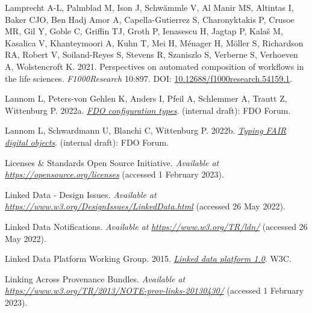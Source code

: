 \begin{CSLReferences}{1}{0}
\leavevmode{}%
Lamprecht A-L, Palmblad M, Ison J, Schwämmle V, Al Manir MS, Altintas I, Baker CJO, Ben Hadj Amor A, Capella-Gutierrez S, Charonyktakis P, Crusoe MR, Gil Y, Goble C, Griffin TJ, Groth P, Ienasescu H, Jagtap P, Kalaš M, Kasalica V, Khanteymoori A, Kuhn T, Mei H, Ménager H, Möller S, Richardson RA, Robert V, Soiland-Reyes S, Stevens R, Szaniszlo S, Verberne S, Verhoeven A, Wolstencroft K. 2021. Perspectives on automated composition of workflows in the life sciences. \emph{F1000Research} 10:897. DOI: \href{https://doi.org/10.12688/f1000research.54159.1}{10.12688/f1000research.54159.1}.

\leavevmode{}%
Lannom L, Peters-von Gehlen K, Anders I, Pfeil A, Schlemmer A, Trautt Z, Wittenburg P. 2022a. \emph{\href{https://docs.google.com/document/d/1ivvg3C_QWSO9PIQwkKT89xG4fBhNAs7_6b0Dz11EwDg/edit}{FDO configuration types}}. (internal draft): FDO Forum.

\leavevmode{}%
Lannom L, Schwardmann U, Blanchi C, Wittenburg P. 2022b. \emph{\href{https://docs.google.com/document/d/1X0hcOVIqP7iYIJf9u-7x3RwcXK8ecsauy0FZg_6-Bg0/edit}{Typing FAIR digital objects}}. (internal draft): FDO Forum.

\leavevmode{}%
Licenses \& Standards \textbar{} Open Source Initiative. \emph{Available at} \href{https://opensource.org/licenses}{\emph{https://opensource.org/licenses}} (accessed 1 February 2023).

\leavevmode{}%
Linked Data - Design Issues. \emph{Available at} \href{https://www.w3.org/DesignIssues/LinkedData.html}{\emph{https://www.w3.org/DesignIssues/LinkedData.html}} (accessed 26 May 2022).

\leavevmode{}%
Linked Data Notifications. \emph{Available at} \href{https://www.w3.org/TR/ldn/}{\emph{https://www.w3.org/TR/ldn/}} (accessed 26 May 2022).

\leavevmode{}%
Linked Data Platform Working Group. 2015. \emph{\href{https://www.w3.org/TR/2015/REC-ldp-20150226/}{Linked data platform 1.0}}. W3C.

\leavevmode{}%
Linking Across Provenance Bundles. \emph{Available at} \href{https://www.w3.org/TR/2013/NOTE-prov-links-20130430/}{\emph{https://www.w3.org/TR/2013/NOTE-prov-links-20130430/}} (accessed 1 February 2023).


\end{CSLReferences}
